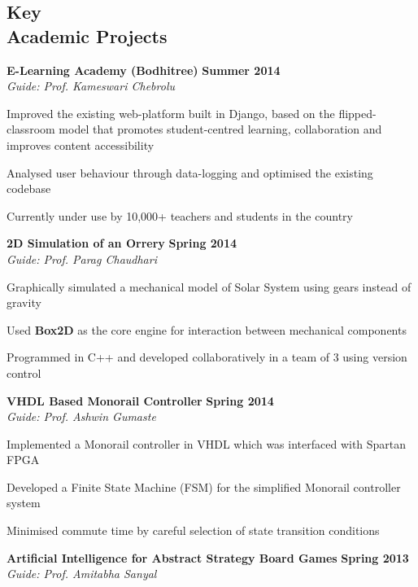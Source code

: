 \documentclass[margin,11pt]{resume}
\begin{document}
\begin{resume}
\section{\mysidestyle Key \\ Academic Projects}
\textbf{E-Learning Academy (Bodhitree)} \hfill \textbf{Summer 2014}\\
\textsl{Guide: Prof. Kameswari Chebrolu}
\begin{list2}
\item Improved the existing web-platform built in Django, based on the flipped-classroom model that promotes student-centred learning, collaboration and improves content accessibility 
\item Analysed user behaviour through data-logging and optimised the existing codebase
\item Currently under use by 10,000+ teachers and students in the country
\end{list2}
\vspace{-2.5mm}
\textbf{2D Simulation of an Orrery} \hfill \textbf{Spring 2014}\\
\textsl{Guide: Prof. Parag Chaudhari}
\begin{list2}
\item Graphically simulated a mechanical model of Solar System using gears instead of gravity
\item Used \textbf{Box2D} as the core engine for interaction between mechanical components
\item Programmed in C++ and developed collaboratively in a team of 3 using version control
\end{list2}
\vspace{-2.5mm}
\textbf{VHDL Based Monorail Controller} \hfill \textbf{Spring 2014}\\
\textsl{Guide: Prof. Ashwin Gumaste}
\begin{list2}
\item Implemented a Monorail controller in VHDL which was interfaced with Spartan FPGA
\item Developed a Finite State Machine (FSM) for the simplified Monorail controller system
\item Minimised commute time by careful selection of state transition conditions
\end{list2}
\vspace{-2.5mm}
\textbf{Artificial Intelligence for Abstract Strategy Board Games} \hfill \textbf{Spring 2013}\\
\textsl{Guide: Prof. Amitabha Sanyal}
\begin{list2}

\end{list2}
\end{resume}
\end{document}
